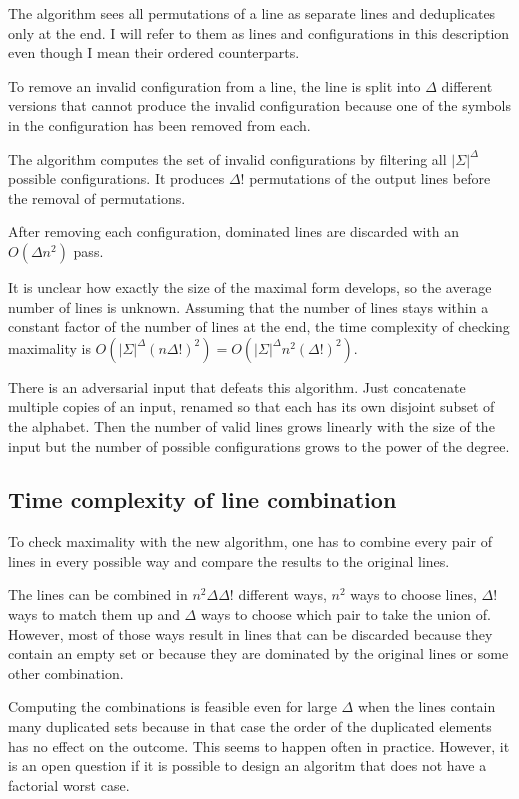 \documentclass[english, 12pt, a4paper, sci, a-1b, online]{aaltothesis}
\begin{document}
The algorithm sees all permutations of a line as separate lines and deduplicates only at the end. I will refer to them as lines and configurations in this description even though I mean their ordered counterparts.

To remove an invalid configuration from a line, the line is split into $\Delta$ different versions that cannot produce the invalid configuration because one of the symbols in the configuration has been removed from each.

The algorithm computes the set of invalid configurations by filtering all $|\Sigma|^{\Delta}$ possible configurations. It produces $\Delta!$ permutations of the output lines before the removal of permutations.

After removing each configuration, dominated lines are discarded with an $O(\Delta n^2)$ pass.

It is unclear how exactly the size of the maximal form develops, so the average number of lines is unknown. Assuming that the number of lines stays within a constant factor of the number of lines at the end, the time complexity of checking maximality is $O(|\Sigma|^{\Delta}{(n\Delta!)}^2) = O(|\Sigma|^{\Delta}n^2(\Delta!)^2)$.

There is an adversarial input that defeats this algorithm. Just concatenate multiple copies of an input, renamed so that each has its own disjoint subset of the alphabet. Then the number of valid lines grows linearly with the size of the input but the number of possible configurations grows to the power of the degree.

\subsection{Time complexity of line combination}

To check maximality with the new algorithm, one has to combine every pair of lines in every possible way and compare the results to the original lines.

The lines can be combined in $n^2\Delta\Delta!$ different ways, $n^2$ ways to choose lines, $\Delta!$ ways to match them up and $\Delta$ ways to choose which pair to take the union of. However, most of those ways result in lines that can be discarded because they contain an empty set or because they are dominated by the original lines or some other combination.

Computing the combinations is feasible even for large $\Delta$ when the lines contain many duplicated sets because in that case the order of the duplicated elements has no effect on the outcome. This seems to happen often in practice. However, it is an open question if it is possible to design an algoritm that does not have a factorial worst case.
\end{document}
